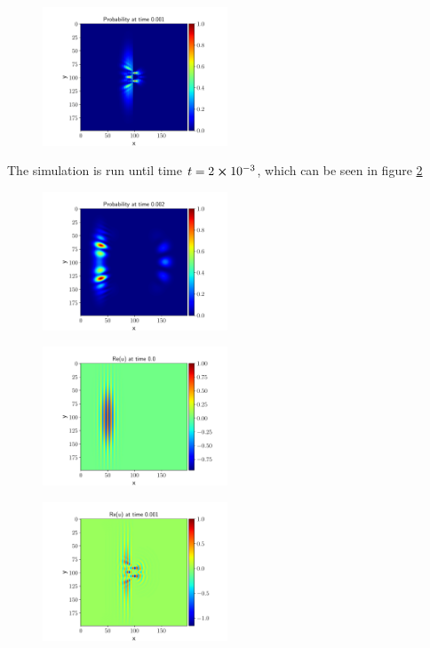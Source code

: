 \documentclass[english,notitlepage,reprint,nofootinbib]{revtex4-2}  %
\begin{document}
	\begin{figure}[h!]
		\centering
		\includegraphics[trim={1cm 0cm 1cm 0cm},clip,width=0.49\textwidth]{figures/prob_plot_0.001.pdf}
		\caption{}
		\label{fig:prob8_P1}
	\end{figure}
The simulation is run until time $t=2\cross10^{-3}$, which can be seen in figure \ref{fig:prob8_P2}
	\begin{figure}[h!]
		\centering
		\includegraphics[trim={1cm 0cm 1cm 0cm},clip,width=0.49\textwidth]{figures/prob_plot_0.002.pdf}
		\caption{}
		\label{fig:prob8_P2}
	\end{figure}

	\begin{figure}[h!]
		\centering
		\includegraphics[trim={1cm 0cm 1cm 0cm},clip,width=0.49\textwidth]{figures/real_plot_0.0.pdf}
		\caption{}
		\label{fig:prob8_Re0}
	\end{figure}

	\begin{figure}[h!]
		\centering
		\includegraphics[trim={1cm 0cm 1cm 0cm},clip,width=0.49\textwidth]{figures/real_plot_0.001.pdf}
		\caption{}
		\label{fig:prob8_Re1}
	\end{figure}
\end{document}
